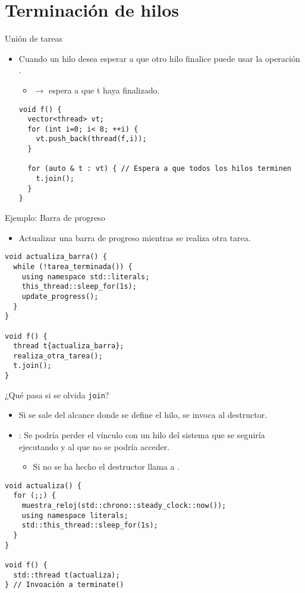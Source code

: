 \section{Terminación de hilos}

\begin{frame}[t,fragile]{Unión de tareas}
\begin{itemize}
  \item Cuando un hilo desea esperar a que otro hilo finalice puede usar la operación .
    \begin{itemize}
      \item {} $\rightarrow$ espera a que t haya finalizado.
    \end{itemize}
\begin{lstlisting}
void f() {
  vector<thread> vt;
  for (int i=0; i< 8; ++i) {
    vt.push_back(thread(f,i));
  }

  for (auto & t : vt) { // Espera a que todos los hilos terminen
    t.join();
  }
}
\end{lstlisting}
\end{itemize}
\end{frame}

\begin{frame}[t,fragile]{Ejemplo: Barra de progreso}
\begin{itemize}
  \item Actualizar una barra de progreso mientras se realiza otra tarea.
\end{itemize}
\begin{lstlisting}
void actualiza_barra() {
  while (!tarea_terminada()) {
    using namespace std::literals;
    this_thread::sleep_for(1s);
    update_progress();
  }
}

void f() {
  thread t{actualiza_barra};
  realiza_otra_tarea();
  t.join();
}
\end{lstlisting}
\end{frame}

\begin{frame}[t,fragile]{¿Qué pasa si se olvida \texttt{join}?}
\begin{itemize}
  \item Si se sale del alcance donde se define el hilo, se invoca al destructor.
  \item {}: Se podría perder el vínculo con un hilo del sistema que se seguiría
        ejecutando y al que no se podría acceder.
    \begin{itemize}
      \item Si no se ha hecho  el destructor llama a .
    \end{itemize}
\end{itemize}
\begin{lstlisting}
void actualiza() {
  for (;;) {
    muestra_reloj(std::chrono::steady_clock::now());
    using namespace literals;
    std::this_thread::sleep_for(1s);
  }
}

void f() {
  std::thread t(actualiza);
} // Invoación a terminate()
\end{lstlisting}
\end{frame}

